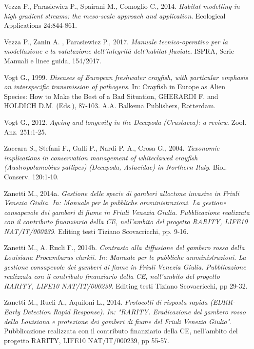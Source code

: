 \documentclass[11pt,a4paper,italian,twoside,openany]{memoir}
\begin{document}
\begin{thebibliography}{9}
 Vezza P., Parasiewicz P., Spairani M., Comoglio C., 2014. \emph{Habitat modelling in high gradient streams: the meso-scale approach and application}. Ecological Applications 24:844-861.

 Vezza P., Zanin A. , Parasiewicz P., 2017. \emph{Manuale tecnico-operativo per la modellazione e la valutazione dell'integrità dell'habitat fluviale}. ISPRA, Serie Manuali e linee guida, 154/2017.

 Vogt G., 1999. \emph{Diseases of European freshwater crayfish, with particular emphasis on interspecific transmission of pathogens}. In: Crayfish in Europe as Alien Species: How to Make the Best of a Bad Situation, GHERARDI F. and HOLDICH D.M. (Eds.), 87-103. A.A. Balkema Publishers, Rotterdam.

 Vogt G., 2012. \emph{Ageing and longevity in the Decapoda (Crustacea): a review}. Zool. Anz. 251:1-25.

 Zaccara S., Stefani F., Galli P., Nardi P. A., Crosa G., 2004. \emph{Taxonomic implications in conservation management of whiteclawed crayfish (Austropotamobius pallipes) (Decapoda, Astacidae) in Northern Italy}. Biol. Conserv. 120:1-10.

 Zanetti M., 2014a. \emph{Gestione delle specie di gamberi alloctone invasive in Friuli Venezia Giulia. In: Manuale per le pubbliche amministrazioni. La gestione consapevole dei gamberi di fiume in Friuli Venezia Giulia. Pubblicazione realizzata con il contributo finanziario della CE, nell'ambito del progetto RARITY, LIFE10 NAT/IT/000239}. Editing testi Tiziano Scovacricchi, pp. 9-16.

 Zanetti M., A. Rucli F., 2014b. \emph{Contrasto alla diffusione del gambero rosso della Louisiana Procambarus clarkii. In: Manuale per le pubbliche amministrazioni. La gestione consapevole dei gamberi di fiume in Friuli Venezia Giulia. Pubblicazione realizzata con il contributo finanziario della CE, nell'ambito del progetto RARITY, LIFE10 NAT/IT/000239}. Editing testi Tiziano Scovacricchi, pp 29-32.

 Zanetti M., Rucli A., Aquiloni L., 2014. \emph{Protocolli di risposta rapida (EDRR- Early Detection Rapid Response). In: "RARITY. Eradicazione del gambero rosso della Louisiana e protezione dei gamberi di fiume del Friuli Venezia Giulia"}. Pubblicazione realizzata con il contributo finanziario della CE, nell'ambito del progetto RARITY, LIFE10 NAT/IT/000239, pp 55-57.


\end{thebibliography}
\end{document}
